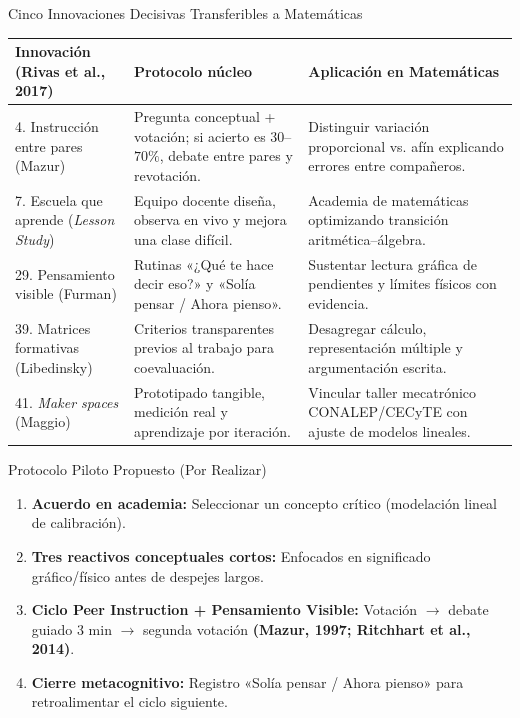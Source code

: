\documentclass[aspectratio=169,spanish,xcolor=table]{beamer}
\begin{document}
\begin{frame}{Cinco Innovaciones Decisivas Transferibles a Matemáticas}
  \renewcommand{\arraystretch}{1.25}
  \scriptsize
  \begin{tabular}{p{3.6cm}p{4.6cm}p{5.2cm}}
    \toprule
    \textbf{Innovación (Rivas et al., 2017)} & \textbf{Protocolo núcleo} & \textbf{Aplicación en Matemáticas} \\
    \midrule
    4. Instrucción entre pares (Mazur) & Pregunta conceptual + votación; si acierto es $30$--$70\%$, debate entre pares y revotación. & Distinguir variación proporcional vs. afín explicando errores entre compañeros. \\
    7. Escuela que aprende (\textit{Lesson Study}) & Equipo docente diseña, observa en vivo y mejora una clase difícil. & Academia de matemáticas optimizando transición aritmética--álgebra. \\
    29. Pensamiento visible (Furman) & Rutinas «¿Qué te hace decir eso?» y «Solía pensar / Ahora pienso». & Sustentar lectura gráfica de pendientes y límites físicos con evidencia. \\
    39. Matrices formativas (Libedinsky) & Criterios transparentes previos al trabajo para coevaluación. & Desagregar cálculo, representación múltiple y argumentación escrita. \\
    41. \textit{Maker spaces} (Maggio) & Prototipado tangible, medición real y aprendizaje por iteración. & Vincular taller mecatrónico CONALEP/CECyTE con ajuste de modelos lineales. \\
    \bottomrule
  \end{tabular}
\end{frame}

\begin{frame}{Protocolo Piloto Propuesto (Por Realizar)}
  \begin{enumerate}\normalsize
    \item \textbf{Acuerdo en academia:} Seleccionar un concepto crítico (modelación lineal de calibración).
    \item \textbf{Tres reactivos conceptuales cortos:} Enfocados en significado gráfico/físico antes de despejes largos.
    \item \textbf{Ciclo Peer Instruction + Pensamiento Visible:} Votación $\rightarrow$ debate guiado 3 min $\rightarrow$ segunda votación \textbf{(Mazur, 1997; Ritchhart et al., 2014)}.
    \item \textbf{Cierre metacognitivo:} Registro «Solía pensar / Ahora pienso» para retroalimentar el ciclo siguiente.
  \end{enumerate}
\end{frame}
\end{document}
